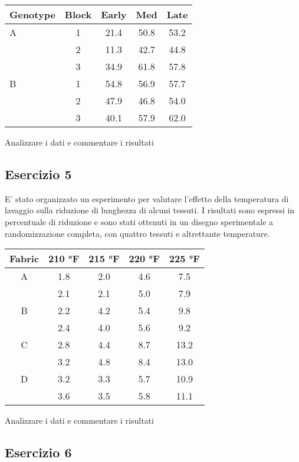\documentclass[a4paper,12pt,oneside]{book}
\begin{document}
\begin{longtable}[]{@{}lcccc@{}}
\toprule
Genotype & Block & Early & Med & Late \\
\midrule
\endhead
A & 1 & 21.4 & 50.8 & 53.2 \\
& 2 & 11.3 & 42.7 & 44.8 \\
& 3 & 34.9 & 61.8 & 57.8 \\
B & 1 & 54.8 & 56.9 & 57.7 \\
& 2 & 47.9 & 46.8 & 54.0 \\
& 3 & 40.1 & 57.9 & 62.0 \\
\bottomrule
\end{longtable}

Analizzare i dati e commentare i risultati

\hypertarget{esercizio-5-3}{%
\subsection{Esercizio 5}\label{esercizio-5-3}}

E' stato organizzato un esperimento per valutare l'effetto della temperatura di lavaggio sulla riduzione di lunghezza di alcuni tessuti. I risultati sono espressi in percentuale di riduzione e sono stati ottenuti in un disegno sperimentale a randomizzazione completa, con quattro tessuti e altrettante temperature.

\begin{longtable}[]{@{}ccccc@{}}
\toprule
Fabric & 210 °F & 215 °F & 220 °F & 225 °F \\
\midrule
\endhead
A & 1.8 & 2.0 & 4.6 & 7.5 \\
& 2.1 & 2.1 & 5.0 & 7.9 \\
B & 2.2 & 4.2 & 5.4 & 9.8 \\
& 2.4 & 4.0 & 5.6 & 9.2 \\
C & 2.8 & 4.4 & 8.7 & 13.2 \\
& 3.2 & 4.8 & 8.4 & 13.0 \\
D & 3.2 & 3.3 & 5.7 & 10.9 \\
& 3.6 & 3.5 & 5.8 & 11.1 \\
\bottomrule
\end{longtable}

Analizzare i dati e commentare i risultati

\hypertarget{esercizio-6-2}{%
\subsection{Esercizio 6}\label{esercizio-6-2}}
\end{document}
